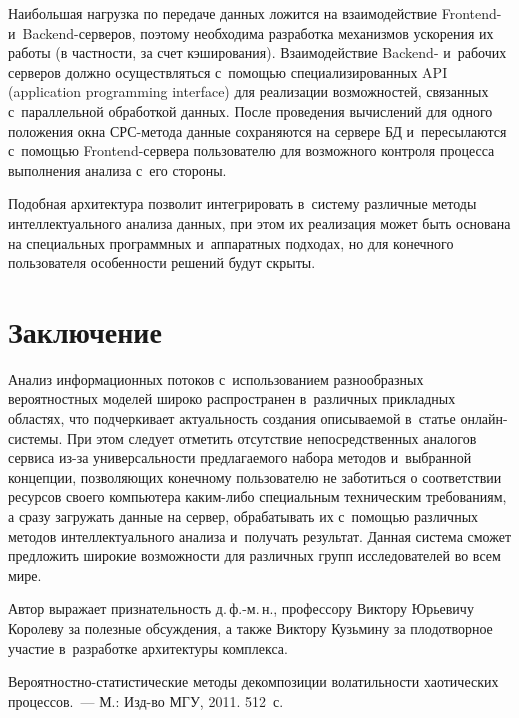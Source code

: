 \begin{multicols}{2}
Наибольшая нагрузка по передаче данных ложится на взаимодействие 
Frontend- и~Backend-сер\-ве\-ров, поэтому необходима разработка механизмов 
ускорения их работы (в частности, за счет кэширования). Взаимодействие Backend- 
и~рабочих серверов должно осуществляться с~по\-мощью специализированных API 
(application programming interface) для 
реализации возможностей, связанных с~параллельной обработкой данных. После проведения 
вычислений для одного положения окна СРС-ме\-то\-да данные сохраняются на сервере БД 
и~пересылаются с~помощью Frontend-сер\-ве\-ра пользователю для возможного контроля 
процесса выполнения анализа с~его стороны.

Подобная архитектура позволит интегрировать в~систему различные методы 
интеллектуального анализа данных, при этом их реализация может быть 
основана на специальных программных  и~аппаратных подходах, но для 
конечного пользователя особенности решений будут скрыты.

\section{Заключение}

Анализ информационных потоков с~использованием разнообразных 
вероятностных моделей широко распространен в~различных прикладных областях, 
что подчеркивает актуальность создания описыва\-емой в~статье он\-лайн-сис\-те\-мы. 
При этом следует отметить отсутствие непосредственных аналогов сервиса из-за 
универсальности предлагаемого набора методов и~выбранной концепции, позволяющих 
конечному пользователю не заботиться о соответствии ресурсов своего компьютера 
ка\-ким-ли\-бо специальным техническим требованиям, а сразу загружать данные на 
сервер, обрабатывать их с~по\-мощью различных методов интеллектуального анализа 
и~получать результат. Данная система сможет предложить широкие возможности 
для различных групп исследователей во всем мире.

\bigskip

{Автор выражает признательность д.\,ф.-м.\,н., профессору 
Виктору Юрьевичу Королеву за полезные обсуждения, а также Виктору Кузьмину 
за плодотворное участие в~разработке архитектуры комплекса.}

{\small\frenchspacing
 {%
 \begin{thebibliography}{99}
Ве\-ро\-ят\-но\-ст\-но-ста\-ти\-сти\-че\-ские методы декомпозиции волатильности
хаотических процессов.~--- М.: Изд-во МГУ, 2011. 512~с.


\end{thebibliography}}}
\end{multicols}
